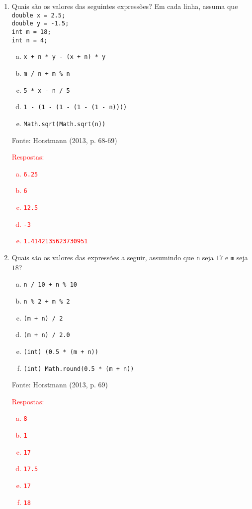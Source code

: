 \documentclass[onecolumn,a4paper,10pt]{report}
\newcommand{\+}{\, + \,}
\newcommand{\<}{\hspace*{-0.4cm}}
\begin{document}
\begin{enumerate}[1.]
\item Quais são os valores das seguintes expressões? Em cada linha, assuma que\\
\texttt{double x = 2.5;\\
double y = -1.5;\\
int m = 18;\\
int n = 4;}
\begin{enumerate}[a)]
\item \texttt{x + n * y - (x + n) * y}
\item \texttt{m / n + m \% n}
\item \texttt{5 * x - n / 5}
\item \texttt{1 - (1 - (1 - (1 - (1 - n))))}
\item \texttt{Math.sqrt(Math.sqrt(n))}
\end{enumerate}
{\tiny Fonte: Horstmann (2013, p. 68-69)}\\
\textcolor{red}{Respostas:
\begin{enumerate}[a)]
\item \texttt{6.25}
\item \texttt{6}
\item \texttt{12.5}
\item \texttt{-3}
\item \texttt{1.4142135623730951}
\end{enumerate}
}

\item Quais são os valores das expressões a seguir, assumindo que \texttt{n} seja $17$ e \texttt{m} seja $18$?
\begin{enumerate}[a)]
\item \texttt{n / 10 + n \% 10}
\item \texttt{n \% 2 + m \% 2}
\item \texttt{(m + n) / 2}
\item \texttt{(m + n) / 2.0}
\item \texttt{(int) (0.5 * (m + n))}
\item \texttt{(int) Math.round(0.5 * (m + n))}
\end{enumerate}
{\tiny Fonte: Horstmann (2013, p. 69)}\\
\textcolor{red}{Respostas:
\begin{enumerate}[a)]
\item \texttt{8}
\item \texttt{1}
\item \texttt{17}
\item \texttt{17.5}
\item \texttt{17}
\item \texttt{18}
\end{enumerate}
}


\end{enumerate}
\end{document}
